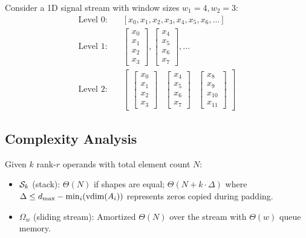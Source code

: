 \begin{example}
Consider a 1D signal stream with window sizes $w_1 = 4, w_2 = 3$:
\begin{align}
\text{Level 0:} &\quad [x_0, x_1, x_2, x_3, x_4, x_5, x_6, \ldots] \\
\text{Level 1:} &\quad \begin{bmatrix} x_0 \\ x_1 \\ x_2 \\ x_3 \end{bmatrix}, \begin{bmatrix} x_4 \\ x_5 \\ x_6 \\ x_7 \end{bmatrix}, \ldots \\
\text{Level 2:} &\quad \begin{bmatrix} \begin{bmatrix} x_0 \\ x_1 \\ x_2 \\ x_3 \end{bmatrix} & \begin{bmatrix} x_4 \\ x_5 \\ x_6 \\ x_7 \end{bmatrix} & \begin{bmatrix} x_8 \\ x_9 \\ x_{10} \\ x_{11} \end{bmatrix} \end{bmatrix}
\end{align}
\end{example}

\subsection{Complexity Analysis}

\begin{proposition}
Given $k$ rank-$r$ operands with total element count $N$:
\begin{itemize}
\item $\mathcal{S}_k$ (stack): $\Theta(N)$ if shapes are equal; $\Theta(N + k \cdot \Delta)$ where $\Delta \leq d_{\max} - \min_i(\operatorname{vdim}(A_i))$ represents zeros copied during padding.
\item $\Omega_w$ (sliding stream): Amortized $\Theta(N)$ over the stream with $\Theta(w)$ queue memory.
\end{itemize}
\end{proposition}

